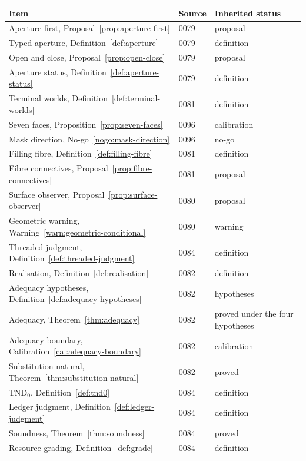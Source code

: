 \begin{longtable}{@{}p{}p{}p{}@{}}
\toprule
Item & Source & Inherited status \\
\midrule
\endhead
Aperture-first, Proposal~\ref{prop:aperture-first} & 0079 & proposal \\
Typed aperture, Definition~\ref{def:aperture} & 0079 & definition \\
Open and close, Proposal~\ref{prop:open-close} & 0079 & proposal \\
Aperture status, Definition~\ref{def:aperture-status} & 0079 & definition \\
Terminal worlds, Definition~\ref{def:terminal-worlds} & 0081 & definition \\
Seven faces, Proposition~\ref{prop:seven-faces} & 0096 & calibration \\
Mask direction, No-go~\ref{nogo:mask-direction} & 0096 & no-go \\
Filling fibre, Definition~\ref{def:filling-fibre} & 0081 & definition \\
Fibre connectives, Proposal~\ref{prop:fibre-connectives} & 0081 & proposal \\
Surface observer, Proposal~\ref{prop:surface-observer} & 0080 & proposal \\
Geometric warning, Warning~\ref{warn:geometric-conditional} & 0080 & warning \\
Threaded judgment, Definition~\ref{def:threaded-judgment} & 0084 & definition \\
Realisation, Definition~\ref{def:realisation} & 0082 & definition \\
Adequacy hypotheses, Definition~\ref{def:adequacy-hypotheses} & 0082 & hypotheses \\
Adequacy, Theorem~\ref{thm:adequacy} & 0082 & proved under the four hypotheses \\
Adequacy boundary, Calibration~\ref{cal:adequacy-boundary} & 0082 & calibration \\
Substitution natural, Theorem~\ref{thm:substitution-natural} & 0082 & proved \\
$\mathrm{TND}_0$, Definition~\ref{def:tnd0} & 0084 & definition \\
Ledger judgment, Definition~\ref{def:ledger-judgment} & 0084 & definition \\
Soundness, Theorem~\ref{thm:soundness} & 0084 & proved \\
Resource grading, Definition~\ref{def:grade} & 0084 & definition \\

\end{longtable}
